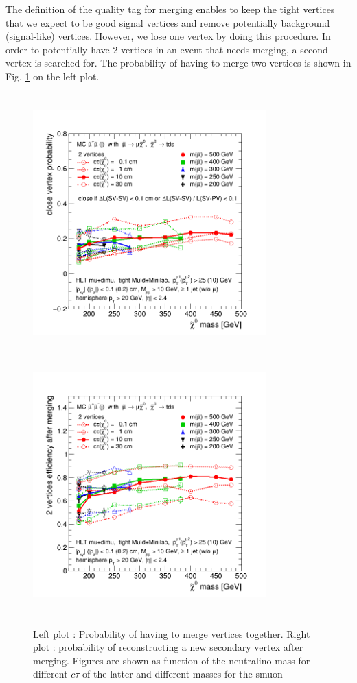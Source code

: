 \documentclass{cernatlasnote}
\begin{document}
The definition of the quality tag for merging enables to keep the tight vertices that we expect to be good signal vertices and remove potentially background (signal-like) vertices. However, we lose one vertex by doing this procedure. In order to potentially have 2 vertices in an event that needs merging, a second vertex is searched for. The probability of having to merge two vertices is shown in Fig.
\ref{fig:MERGE} on the left plot.

        \begin{figure}[ht]
            \hspace{-1cm}
            \includegraphics[height=10cm, width=9cm, trim= 0cm 0cm 0cm 0.cm,clip]{images/Merging/close_2vtx_ctau_240322.png}\includegraphics[height=10cm, width=9cm, trim= 0cm 0cm 0cm 0.cm,clip]{images/Merging/merge_2vtx_ctau_240322.png}
            \caption{\label{fig:MERGE} Left plot : Probability of having to merge vertices together. Right plot : probability of reconstructing a new secondary vertex after merging. Figures are shown as function of the neutralino mass for different $c\tau$ of the latter and different masses for the smuon}
        \end{figure}
        
\end{document}
